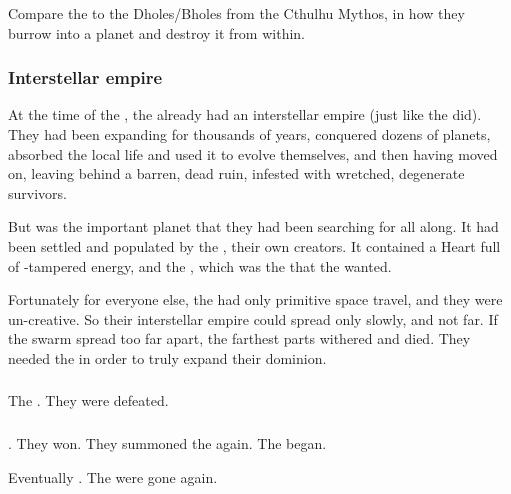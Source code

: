 Compare the \umbrae to the Dholes/Bholes from the Cthulhu Mythos, in how they burrow into a planet and destroy it from within.





\subsubsection{Interstellar empire}
At the time of the \firstbanewar, the \banes already had an interstellar empire (just like the \ophidians did). 
They had been expanding for thousands of years, conquered dozens of planets, absorbed the local life and used it to evolve themselves, and then having moved on, leaving behind a barren, dead ruin, infested with wretched, degenerate survivors. 

But \Miith was the important planet that they had been searching for all along. 
It had been settled and populated by the \voyagers, their own creators. 
It contained a Heart full of \voyager-tampered energy, and the  , which was the  that the \banes wanted. 

Fortunately for everyone else, the \banes had only primitive space travel, and they were un-creative.
So their interstellar empire could spread only slowly, and not far.
If the \bane swarm spread too far apart, the farthest parts withered and died.
They needed the \noggyal {} in order to truly expand their dominion. 





\subsubsection{\Firstbanewar}
The \banes{} . 
They were defeated. 





\subsubsection{\Secondbanewar}
. 
They won.
They summoned the \banes{} again. 
The  began. 

Eventually . 
The \banelords{} were gone again. 





